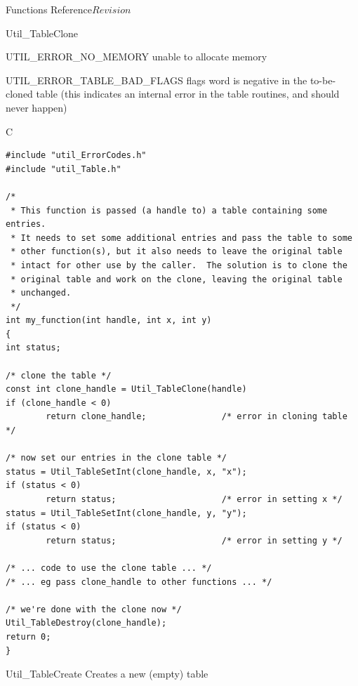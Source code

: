 \begin{cactuspart}{ Functions Reference}{}{$Revision$}
\begin{FunctionDescription}{Util\_TableClone}
\begin{ErrorSection}
\begin{Error}{UTIL\_ERROR\_NO\_MEMORY}
unable to allocate memory
\end{Error}
\begin{Error}{UTIL\_ERROR\_TABLE\_BAD\_FLAGS}
flags word is negative in the to-be-cloned table
(this indicates an internal error in the table routines,
and should never happen)
\end{Error}
\end{ErrorSection}

\begin{ExampleSection}
\begin{Example}{C}
\begin{verbatim}
#include "util_ErrorCodes.h"
#include "util_Table.h"

/*
 * This function is passed (a handle to) a table containing some entries.
 * It needs to set some additional entries and pass the table to some
 * other function(s), but it also needs to leave the original table
 * intact for other use by the caller.  The solution is to clone the
 * original table and work on the clone, leaving the original table
 * unchanged.
 */
int my_function(int handle, int x, int y)
{
int status;

/* clone the table */
const int clone_handle = Util_TableClone(handle)
if (clone_handle < 0)
        return clone_handle;               /* error in cloning table */

/* now set our entries in the clone table */
status = Util_TableSetInt(clone_handle, x, "x");
if (status < 0)
        return status;                     /* error in setting x */
status = Util_TableSetInt(clone_handle, y, "y");
if (status < 0)
        return status;                     /* error in setting y */

/* ... code to use the clone table ... */
/* ... eg pass clone_handle to other functions ... */

/* we're done with the clone now */
Util_TableDestroy(clone_handle);
return 0;
}
\end{verbatim}
\end{Example}
\end{ExampleSection}
\end{FunctionDescription}


\begin{FunctionDescription}{Util\_TableCreate}
\label{Util-TableCreate}
Creates a new (empty) table


\end{FunctionDescription}
\end{cactuspart}
